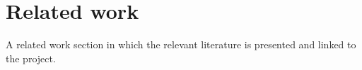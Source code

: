 \section{Related work}
A related work section in which the relevant literature is presented and linked to the project.